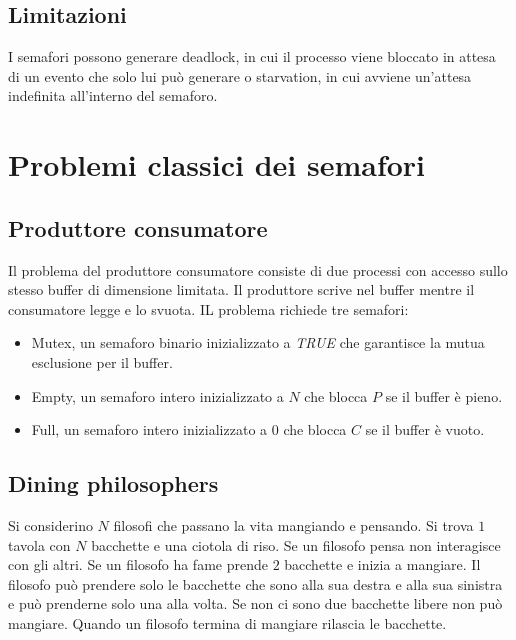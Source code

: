 \subsection{Limitazioni}
I semafori possono generare deadlock, in cui il processo viene bloccato in attesa di un evento che solo lui pu\`o generare o starvation, in cui avviene un'attesa indefinita all'interno
del semaforo. 
\section{Problemi classici dei semafori}
\subsection{Produttore consumatore}
Il problema del produttore consumatore consiste di due processi con accesso sullo stesso buffer di dimensione limitata. Il produttore scrive nel buffer  mentre il consumatore legge e
lo svuota. IL problema richiede tre semafori:
\begin{itemize}
	\item Mutex, un semaforo binario inizializzato a \emph{TRUE} che garantisce la mutua esclusione per il buffer.
	\item Empty, un semaforo intero inizializzato a $N$ che blocca $P$ se il buffer \`e pieno.
	\item Full, un semaforo intero inizializzato a $0$ che blocca $C$ se il buffer \`e vuoto.
\end{itemize}
\newpage
\begin{multicols}{2}
	
	\columnbreak
	
\end{multicols}
\subsection{Dining philosophers}
Si considerino $N$ filosofi che passano la vita mangiando e pensando. Si trova $1$ tavola con $N$ bacchette e una ciotola di riso. Se un filosofo pensa non interagisce con gli altri.
Se un filosofo ha fame prende $2$ bacchette e inizia a mangiare. Il filosofo pu\`o prendere solo le bacchette che sono alla sua destra e alla sua sinistra e pu\`o prenderne solo una 
alla volta. Se non ci sono due bacchette libere non pu\`o mangiare. Quando un filosofo termina di mangiare rilascia le bacchette.
